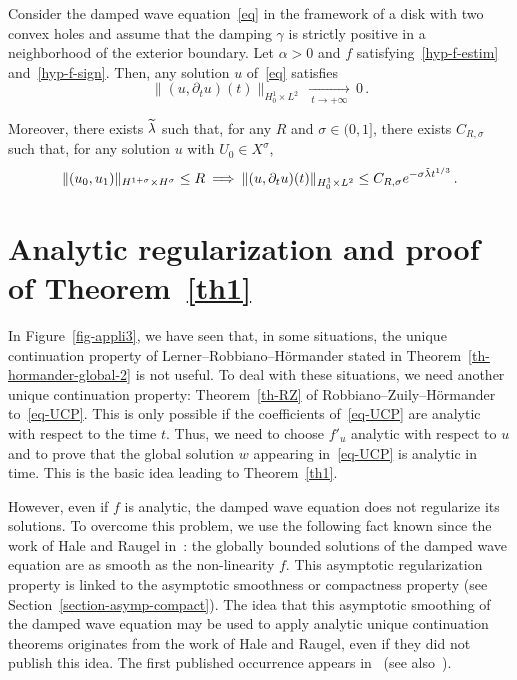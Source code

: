 \documentclass[AHL,Unicode,longabstracts]{cedram}
\let\oldtilde\tilde
\renewcommand*{\tilde}[1]{\mathchoice{\widetilde{#1}}{\widetilde{#1}}{\oldtilde{#1}}{\oldtilde{#1}}}\let\oldexists\exists
\renewcommand*{\exists}{\mathrel{\oldexists}}
\begin{document}
\begin{theo}\label{th-appli3}
Consider the damped wave equation~\eqref{eq} in the framework of a disk with two convex holes and assume that the damping $\gamma$ is strictly positive in a neighborhood of the exterior boundary. Let $\alpha>0$ and $f$ satisfying~\eqref{hyp-f-estim} and~\eqref{hyp-f-sign}. Then, any solution $u$ of~\eqref{eq} satisfies
\[
\|(u,\partial_t u)(t)\|_{H^1_0\times L^2}\,\xrightarrow[\:t\longrightarrow
+\infty\:]{}\,0\,.
\]

Moreover, there exists $\tilde\lambda$ such that, for any $R$ and $\sigma\in (0,1]$, there exists $C_{R,\sigma}$ such that, for any solution $u$ with $U_0\in X^\sigma$,
\[
\|(u_0,u_1)\|_{H^{1+\sigma}\times H^\sigma}\leq
R\:\Longrightarrow\:\|(u,\partial_t u)(t)\|_{H^1_0\times L^2} \leq
C_{R,\sigma}e^{-\sigma\tilde \lambda{t}^{1/3}}\,.
\]
\end{theo}


\section{Analytic regularization and proof of Theorem~\ref{th1}}\label{section-reg-analytic}

In Figure~\ref{fig-appli3}, we have seen that, in some situations, the unique continuation property of Lerner--Robbiano--H\"ormander stated in Theorem~\ref{th-hormander-global-2} is not useful. To deal with these situations, we need another unique continuation property: Theorem~\ref{th-RZ} of Robbiano--Zuily--H\"ormander to~\eqref{eq-UCP}. This is only possible if the coefficients of~\eqref{eq-UCP} are analytic with respect to the time $t$. Thus, we need to choose $f'_u$ analytic with respect to $u$ and to prove that the global solution $w$ appearing in~\eqref{eq-UCP} is analytic in time. This is the basic idea leading to Theorem~\ref{th1}.

However, even if $f$ is analytic, the damped wave equation does not regularize its solutions. To overcome this problem, we use the following fact known since the work of Hale and Raugel in~\cite{Hale-Raugel}: the globally bounded solutions of the damped wave equation are as smooth as the non-linearity $f$. This asymptotic regularization property is linked to the asymptotic smoothness or compactness property (see Section~\ref{section-asymp-compact}). The idea that this asymptotic smoothing of the damped wave equation may be used to apply analytic unique continuation theorems originates from the work of Hale and Raugel, even if they did not publish this idea. The first published occurrence appears in~\cite{RJ} (see also~\cite{RC}).
\end{document}
